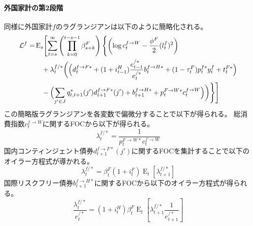 \paragraph{外国家計の第2段階}
\label{sec:model_households_indices_aggregation_stage2_foreign}
同様に外国家計\(f\)のラグランジアンは以下のように簡略化される。
\begin{equation}
\label{form:model_households_indices_aggregation_stage2_foreign_lagrangian_eq}
    \begin{aligned}
        \mathcal{L}^f=&\operatorname{E}_s\Biggl[\sum_{t=s}^{\infty}\left(\prod_{k=0}^{t-s-1}\beta_{s+k}^F\right)\Biggl\{\left(\log c_t^{f\to W}-\frac{\phi^F}{2}(l_t^f)^2\right) \\
        &\quad+\lambda_t^{f/*}\biggl(\Bigl(d_t^{f\to F*}+(1+i_{t-1}^H)\frac{e_{t-1}^{/*}}{e_t^{/*}}b_t^{f\to H*}+(1-\tau_t^F)p_t^{f*}y_t^f+t_t^{F*}\Bigr) \\
        &\quad-\Bigl(\sum_{j'\in J}q_{t,t+1}^*(j')d_{t+1}^{f\to F*}(j')+b_{t+1}^{f\to H*}+p_t^{F\to W*}c_t^{f\to W}\Bigr)\biggr)\Biggr\}\Biggr]
    \end{aligned}
\end{equation}
この簡略版ラグランジアンを各変数で偏微分することで以下が得られる。
総消費指数\(c_t^{f\to W}\)に関するFOCから以下が得られる。
\begin{equation}
\label{form:model_households_indices_aggregation_stage2_foreign_lambda_f_star_p_F_W_star_c_f_W}
    \lambda_t^{f/*}=\frac{1}{p_t^{F\to W*}c_t^{f\to W}}
\end{equation}
国内コンティンジェント債券\(d_{t+1}^{f\to F*}(j')\)に関するFOCを集計することで以下のオイラー方程式が導かれる。
\begin{equation}
\label{form:model_households_indices_aggregation_stage2_foreign_lambda_f_star_i_F_eq}
    \lambda_t^{f/*}=\beta_t^F(1+i_t^F)\operatorname{E}_t[\lambda_{t+1}^{f/*}]
\end{equation}
国際リスクフリー債券\(b_{t+1}^{f\to H*}\)に関するFOCから以下のオイラー方程式が得られる。
\begin{equation}
\label{form:model_households_indices_aggregation_stage2_foreign_lambda_f_star_i_H_eq}
    \frac{\lambda_t^{f/*}}{e_t^{/*}}=(1+i_t^H)\beta_t^F\operatorname{E}_t\left[\lambda_{t+1}^{f/*}\frac{1}{e_{t+1}^{/*}}\right]
\end{equation}